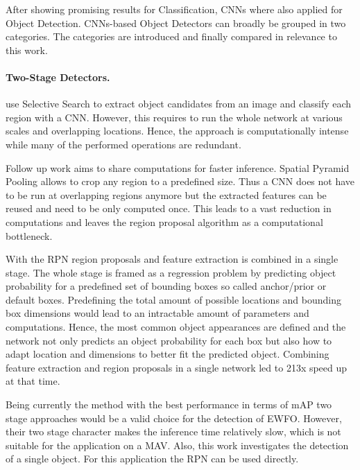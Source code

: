After showing promising results for Classification, \acp{CNN} where also applied for Object Detection. \acp{CNN}-based Object Detectors can broadly be grouped in two categories. The categories are introduced and finally compared in relevance to this work.

\paragraph{Two-Stage Detectors.}

\citeauthor{Girshick2013} \cite{Girshick2013} use Selective Search \cite{Uijlings2013} to extract object candidates from an image and classify each region with a \ac{CNN}. However, this requires to run the whole network at various scales and overlapping locations. Hence, the approach is computationally intense while many of the performed operations are redundant.

Follow up work aims to share computations for faster inference. Spatial Pyramid Pooling \cite{He2014b} allows to crop any region to a predefined size. Thus a \ac{CNN} does not have to be run at overlapping regions anymore but the extracted features can be reused and need to be only computed once. This leads to a vast reduction in computations and leaves the region proposal algorithm as a computational bottleneck.

With the \ac{RPN}\cite{Ren2015} region proposals and feature extraction is combined in a single stage. The whole stage is framed as a regression problem by predicting object probability for a predefined set of bounding boxes so called anchor/prior or default boxes.  Predefining the total amount of possible locations and bounding box dimensions would lead to an intractable amount of parameters and computations. Hence, the most common object appearances are defined and the network not only predicts an object probability for each box but also how to adapt location and dimensions to better fit the predicted object. Combining feature extraction and region proposals in a single network led to 213x speed up at that time.
 
Being currently the method with the best performance in terms of \ac{mAP} two stage approaches would be a valid choice for the detection of \ac{EWFO}. However, their two stage character makes the inference time relatively slow, which is not suitable for the application on a \ac{MAV}. Also, this work investigates the detection of a single object. For this application the \ac{RPN} can be used directly.

